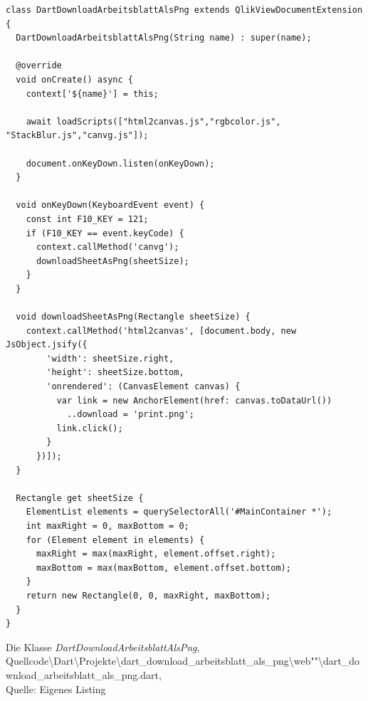 \ifIncludeFigures\begin{listing}[htbp]
\begin{verbatim}
class DartDownloadArbeitsblattAlsPng extends QlikViewDocumentExtension {
  DartDownloadArbeitsblattAlsPng(String name) : super(name);

  @override
  void onCreate() async {
    context['${name}'] = this;     
    
    await loadScripts(["html2canvas.js","rgbcolor.js", "StackBlur.js","canvg.js"]);
    
    document.onKeyDown.listen(onKeyDown);
  }

  void onKeyDown(KeyboardEvent event) {
    const int F10_KEY = 121;
    if (F10_KEY == event.keyCode) {
      context.callMethod('canvg');
      downloadSheetAsPng(sheetSize);
    }
  }

  void downloadSheetAsPng(Rectangle sheetSize) {
    context.callMethod('html2canvas', [document.body, new JsObject.jsify({
        'width': sheetSize.right,
        'height': sheetSize.bottom,
        'onrendered': (CanvasElement canvas) {
          var link = new AnchorElement(href: canvas.toDataUrl())
            ..download = 'print.png';
          link.click();
        }
      })]);
  }

  Rectangle get sheetSize {
    ElementList elements = querySelectorAll('#MainContainer *');
    int maxRight = 0, maxBottom = 0;
    for (Element element in elements) {
      maxRight = max(maxRight, element.offset.right);
      maxBottom = max(maxBottom, element.offset.bottom);
    }
    return new Rectangle(0, 0, maxRight, maxBottom);
  }
}
\end{verbatim}
\caption[Die Klasse \textit{DartDownloadArbeitsblattAlsPng}]{Die Klasse \textit{DartDownloadArbeitsblattAlsPng}, \\Quellcode\textbackslash{}Dart\textbackslash{}Projekte\textbackslash{}dart\_download\_arbeitsblatt\_als\_png\textbackslash{}web""\textbackslash{}dart\_download\_arbeitsblatt\_als\_png.dart, \\Quelle: Eigenes Listing}
\label{lst:DownloadArbeitsblattAlsPngDartDownloadArbeitsblattAlsPngDart}
\end{listing}\fi

